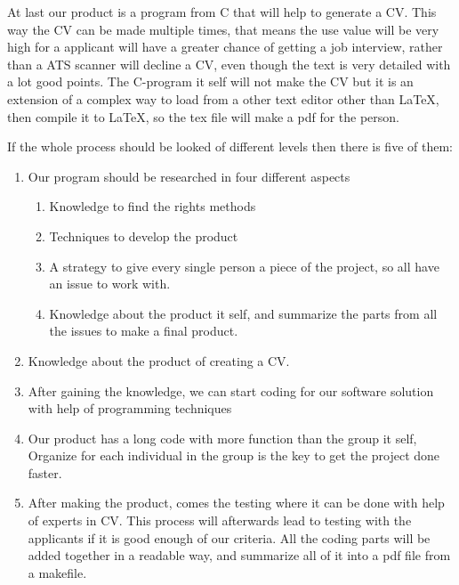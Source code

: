 At last our product is a program from C that will help to generate a CV. This way the CV can be made multiple times,
that means the use value will be very high for a applicant will have a greater chance of getting a job interview,
rather than a ATS scanner will decline a CV, even though the text is very detailed with a lot good points.
The C-program it self will not make the CV but it is an extension of a complex way to load from a other text editor
other than LaTeX, then compile it to LaTeX, so the tex file will make a pdf for the person.

If the whole process should be looked of different levels then there is five of them:

\begin{enumerate}
  \item Our program should be researched in four different aspects 
  \begin{enumerate}
    \item Knowledge to find the rights methods 
    \item Techniques to develop the product
    \item A strategy to give every single person a piece of the project, so all have an issue to work with.
    \item Knowledge about the product it self, and summarize the parts from all the issues to make a final product.
  \end{enumerate}
  \item Knowledge about the product of creating a CV.
  \item After gaining the knowledge,
        we can start coding for our software solution with help of programming techniques
  \item Our product has a long code with more function than the group it self, 
        Organize for each individual in the group is the key to get the project done faster.
  \item After making the product, comes the testing where it can be done with help of experts in CV.
        This process will afterwards lead to testing with the applicants if it is good enough of our criteria.
        All the coding parts will be added together in a readable way, and summarize all of it into a pdf file from a makefile.
\end{enumerate}
